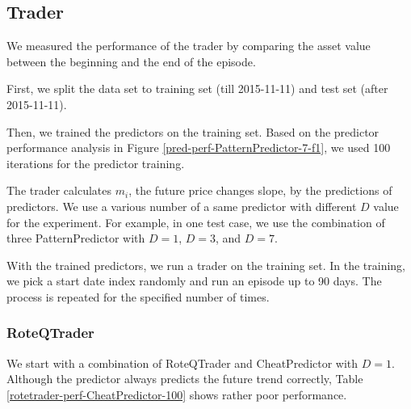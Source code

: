 \documentclass[twocolumn,10pt]{asme2ej}
\begin{document}
\subsection{Trader}

We measured the performance of the trader by comparing the asset value between
the beginning and the end of the episode.

First, we split the data set to training set (till 2015-11-11) and
test set (after 2015-11-11).

Then, we trained the predictors on the training set. Based on the predictor
performance analysis in Figure \ref{pred-perf-PatternPredictor-7-f1}, we used 100
iterations for the predictor training.

The trader calculates $m_i$, the future price changes slope, by the
predictions of predictors. We use a various number of a same predictor
with different $D$ value for the experiment. For example, in one test
case, we use the combination of three PatternPredictor with
$D=1$, $D=3$, and $D=7$.

With the trained predictors, we run a trader on the training set. In
the training, we pick a start date index randomly and run an episode
up to 90 days. The process is repeated for the specified number of
times.

\subsubsection{RoteQTrader}

We start with a combination of RoteQTrader and CheatPredictor with
$D=1$. Although the predictor always predicts the future trend
correctly, Table \ref{rotetrader-perf-CheatPredictor-100} shows rather
poor performance.
\end{document}
